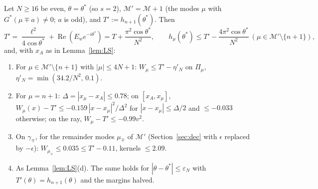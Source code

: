 \documentclass[11pt]{article}
\theoremstyle{definition}\newtheorem{definition}[theorem]{Definition}
\theoremstyle{remark}\newtheorem{remark}[theorem]{Remark}
\begin{document}
\begin{lemma}\label{lem:LSp}
Let $N\ge16$ be even, $\theta=\theta^*$ (so $s=2$), $\mathcal M'=\mathcal M+1$ (the modes $\mu$ with $G^*(\mu\mp a)\ne0$; $a$ is odd), and $T':=h_{n+1}(\theta^*)$. Then
\[T'=\frac{\ell^2}{4\cos\theta^*}+\operatorname{Re}(E_we^{-i\theta^*})=T+\frac{\pi^2\cos\theta^*}{N^2},\qquad h_\mu(\theta^*)\le T'-\frac{4\pi^2\cos\theta^*}{N^2}\ (\mu\in\mathcal M'\setminus\{n+1\}),\]
and, with $x_A$ as in Lemma~\ref{lem:LS}:
\begin{enumerate}
\item[(a$'$)] For $\mu\in\mathcal M'\setminus\{n+1\}$ with $|\mu|\le4N+1$: $W_\mu\le T'-\eta'_N$ on $\Pi_\mu$, $\eta'_N=\min(34.2/N^2,\,0.1)$.
\item[(b$'$)] For $\mu=n+1$: $\Delta=|x_\mu-x_A|\le0.78$; on $[x_A,x_\mu]$, $W_\mu(x)-T'\le-0.159\,|x-x_\mu|^2/\Delta^2$ for $|x-x_\mu|\le\Delta/2$ and $\le-0.033$ otherwise; on the ray, $W_\mu-T'\le-0.99v^2$.
\item[(c$'$)] On $\gamma_\mp$, for the remainder modes $\mu_\mp$ of $\mathcal M'$ (Section~\ref{sec:dec} with $\epsilon$ replaced by $-\epsilon$): $W_{\mu_\mp}\le0.035\le T'-0.11$, kernels $\le2.09$.
\item[(d$'$)] As Lemma~\ref{lem:LS}(d). The same holds for $|\theta-\theta^*|\le\varepsilon_N$ with $T'(\theta)=h_{n+1}(\theta)$ and the margins halved.
\end{enumerate}
\end{lemma}
\end{document}
